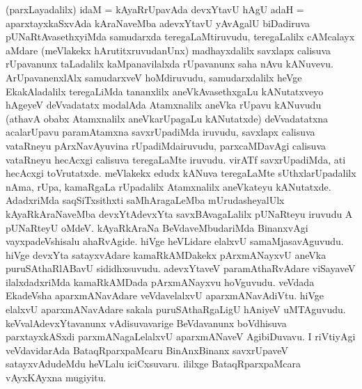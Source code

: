 \begin{artha}
(parxLayadalilx) idaM = kAyaRrUpavAda devxYtavU hAgU adaH = aparxtayxkaSxvAda kAraNaveMba adevxYtavU yAvAgalU biDadiruva pUNaRtAvasethxyiMda samudarxda teregaLaMtiruvudu, teregaLalilx cAMcalayx aMdare (meVlakekx hArutitxruvudanUnx) madhayxdalilx savxlapx calisuva rUpavanunx taLadalilx kaMpanavilalxda rUpavanunx saha nAvu kANuvevu. ArUpavanenxlAlx samudarxveV hoMdiruvudu, samudarxdalilx heVge EkakAladalilx teregaLiMda tananxlilx  aneVkAvasethxgaLu kANutatxveyo hAgeyeV deVvadatatx modalAda Atamxnalilx aneVka rUpavu kANuvudu (athavA obabx Atamxnalilx aneVkarUpagaLu kANutatxde) deVvadatatxna acalarUpavu paramAtamxna savxrUpadiMda  iruvudu, savxlapx calisuva vataRneyu pArxNavAyuvina rUpadiMda\break iruvudu, parxcaMDavAgi calisuva vataRneyu hecAcxgi calisuva teregaLaMte iruvudu. virATf savxrUpadiMda, ati hecAcxgi toVrutatxde. meVlakekx edudx kANuva teregaLaMte sUthxlarUpadalilx nAma, rUpa, kamaRgaLa rUpadalilx Atamxnalilx aneVkateyu kANutatxde. AdadxriMda saqSiTxsithxti saMhAragaLeMba mUrudasheyalUlx kAyaRkAraNaveMba devxYtAdevxYta savxBAvagaLalilx pUNaRteyu iruvudu A pUNaRteyU oMdeV. kAyaRkAraNa BeVdaveMbudariMda BinanxvAgi vayxpadeVshisalu ahaRvAgide. hiVge heVLidare elalxvU samaMjasavAguvudu. hiVge devxYta satayxvAdare kamaRkAMDakekx pArxmANayxvU aneVka puruSAthaRlABavU sididhxsuvudu. adevxYtaveV paramAthaRvAdare viSayaveV ilalxdadxriMda kamaRkAMDada pArxmANayxvu hoVguvudu. veVdada EkadeVsha aparxmANavAdare veVdavelalxvU aparxmANavAdiVtu. hiVge elalxvU aparxmANavAdare sakala puruSAthaRgaLigU hAniyeV uMTAguvudu. keVvalAdevxYtavanunx vAdisuvavarige BeVdavanunx boVdhisuva parxtayxkASxdi parxmANagaLelalxvU aparxmANaveV AgibiDuvavu. I riVtiyAgi veVdavidarAda BataqRparxpaMcaru BinAnxBinanx savxrUpaveV satayxvAdudeMdu heVLalu iciCxsuvaru. ililxge BataqRparxpaMcara vAyxKAyxna mugiyitu. 
\end{artha}


